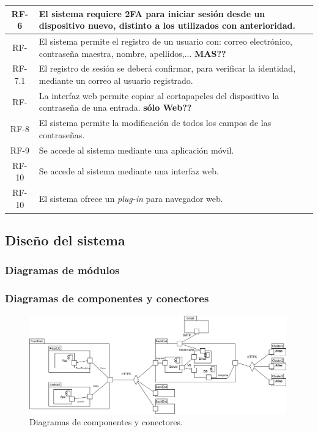 \documentclass{article}
\begin{document}
\begin{table}[H]
\begin{tabular}{| c | p{30em} |}
        RF-6 & El sistema requiere 2FA para iniciar sesión desde un dispositivo nuevo, distinto a los utilizados con anterioridad. \\ \hline
        RF- & El sistema permite el registro de un usuario con: correo electrónico, contraseña maestra, nombre, apellidos,... \textbf{MAS??}\\ \hline %
        RF-7.1 & El registro de sesión se deberá confirmar, para verificar la identidad, mediante un correo al usuario registrado. \\ \hline
        RF- & La interfaz web permite copiar al cortapapeles del dispositivo la contraseña de una entrada. \textbf{sólo Web??}\\ \hline %
        RF-8 & El sistema permite la modificación de todos los campos de las contraseñas. \\ \hline
        RF-9 & Se accede al sistema mediante una aplicación móvil. \\ \hline
        RF-10 & Se accede al sistema mediante una interfaz web. \\ \hline
        RF-10 & El sistema ofrece un \textit{plug-in} para navegador web. \\ \hline
    \end{tabular}
\end{table}

\subsection{Diseño del sistema}

\subsubsection*{Diagramas de módulos}



\subsubsection*{Diagramas de componentes y conectores}

\begin{figure}[H]
    \centering
        \includegraphics[width=0.99\textwidth]{../images/cyc.png}
    \caption{Diagramas de componentes y conectores.}
    \label{cyc}
\end{figure}
\end{document}
